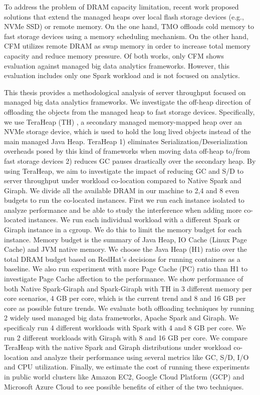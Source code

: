 To address the problem of DRAM capacity limitation, recent work
proposed solutions that extend the managed heaps over local flash
storage devices (e.g., NVMe SSD) or remote memory. On the one hand,
TMO \cite{TMO} offloads cold memory to fast storage devices using
a memory scheduling mechanism. On the other hand, CFM \cite{CFM}
utilizes remote DRAM as swap memory in order to increase total memory capacity
and reduce memory pressure. Of both works, only CFM shows
evaluation against managed big data analytics frameworks. However, this evaluation
includes only one Spark workload and is not focused on analytics.

This thesis provides a methodological analysis of server throughput 
focused on managed big data analytics frameworks.
We investigate the off-heap direction of offloading the objects from the
managed heap to fast storage devices.
Specifically, we use TeraHeap (TH) \cite{TeraHeap}, a secondary managed
memory-mapped heap over an NVMe storage device, which is used to hold
the long lived objects instead of the main managed Java Heap. TeraHeap
1) eliminates Serialization/Deserialization overheads posed by this
kind of frameworks when moving data off-heap to/from fast storage
devices 2) reduces GC pauses drastically over the secondary heap. By
using TeraHeap, we aim to investigate the impact of reducing GC and S/D
to server throughput under workload co-location compared to Native Spark
and Giraph. We divide all the available DRAM
in our machine to 2,4 and 8 even budgets to run the co-located instances.
First we run each instance isolated to analyze performance and be able to study the interference when adding more
co-located instances. We run each individual workload with a different Spark or Giraph instance in a cgroup.
We do this to limit the memory budget for each instance. Memory budget is
the summary of Java Heap, IO Cache (Linux Page Cache) and JVM native memory. We choose
the Java Heap (H1) ratio over the total DRAM budget based on RedHat's decisions
for running containers as a baseline. We also run experiment with more Page Cache (PC) ratio than H1
to investigate Page Cache affection to the performance. We show performance of both Native Spark-Giraph and Spark-Giraph with TH in 3 different
memory per core scenarios, 4 GB per core, which is the current trend and 8 and 16 GB per core 
as possible future trends. We evaluate both offloading techniques by running 2 widely used
managed big data frameworks, Apache Spark and Giraph. We
specificaly run 4 different workloads with Spark with 4 and 8 GB per core.
We run 2 different workloads with Giraph with 8 and 16 GB per core.
We compare TeraHeap with the native Spark and Giraph distributions under workload
co-location and analyze their performance using several metrics like
GC, S/D, I/O and CPU utilization. Finally, we estimate the cost of running these
experiments in public world clusters like Amazon EC2, Google Cloud Platform (GCP)
and Microsoft Azure Cloud to see possible benefits of either of the two techniques.

